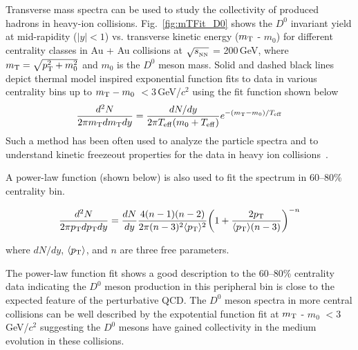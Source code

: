 \documentclass[%
 reprint,	
 amsmath,amssymb,
 aps,
 prc,
]{revtex4-1}
\begin{document}
Transverse mass spectra can be used to study the collectivity of produced hadrons in heavy-ion collisions. Fig.~\ref{fig:mTFit_D0} shows the $D^{0}$ invariant yield at mid-rapidity ($|y|<1$) vs. transverse kinetic energy ($m_{\rm T}$ - $m_{0}$) for different centrality classes in Au + Au collisions at $\sqrt{s_{_{\rm NN}}}$ = 200\,GeV, where $m_{\rm T} = \sqrt{p_{\rm T}^2+m_0^2}$ and $m_0$ is the $D^0$ meson mass. Solid and dashed black lines depict thermal model inspired exponential function fits to data in various centrality bins up to $m_{\rm T} - m_{0}$ $<3$\,GeV/$c^2$ using the fit function shown below
\[
\frac{d^2N}{2\pi m_{\rm T}dm_{\rm T}dy} = \frac{dN/dy}{2\pi T_{\rm eff}(m_0+T_{\rm eff})}e^{-(m_{\rm T}-m_0)/T_{\rm eff}}
\]
Such a method has been often used to analyze the particle spectra and to understand kinetic freezeout properties for the data in heavy ion collisions~\cite{Kaneta:1999lnf,StarWhitePaper}.


A power-law function (shown below) is also used to fit the spectrum in 60--80\% centrality bin. 

\[
\frac{d^2N}{2\pi p_{\rm T}dp_{\rm T}dy} = \frac{dN}{dy}\frac{4(n-1)(n-2)}{2\pi (n-3)^2\langle p_{\rm T} \rangle ^2}\bigg(1+\frac{2p_{\rm T}}{\langle p_{\rm T} \rangle (n-3)}\bigg)^{-n}
\]

where $dN/dy$, $\langle p_{\rm T}\rangle$, and $n$ are three free parameters.

The power-law function fit shows a good description to the 60--80\% centrality data indicating the $D^0$ meson production in this peripheral bin is close to the expected feature of the perturbative QCD. The $D^0$ meson spectra in more central collisions can be well described by the expotential function fit at $m_{\rm T}$ - $m_{0}$ $<3$\,GeV/$c^2$ suggesting the $D^0$ mesons have gained collectivity in the medium evolution in these collisions.


\end{document}
